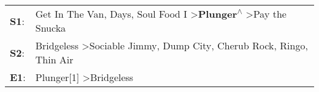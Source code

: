 \begin{supertabular}{p{0.03\textwidth}p{0.92\textwidth}}
 \textbf{S1}:  &      Get In The Van\textsuperscript{},  Days\textsuperscript{}, \enspace Soul Food I\textsuperscript{} \textgreater \enspace \textbf{Plunger\textsuperscript{$\wedge$}} \textgreater \enspace Pay the Snucka\textsuperscript{}  \enspace  \\
 \textbf{S2}:  &  Bridgeless\textsuperscript{} \textgreater \enspace Sociable Jimmy\textsuperscript{}, \enspace Dump City\textsuperscript{}, \enspace Cherub Rock\textsuperscript{}, \enspace Ringo\textsuperscript{}, \enspace Thin Air\textsuperscript{}  \enspace  \\
 \textbf{E1}:  &                                                                                                                                                           Plunger[1]\textsuperscript{} \textgreater \enspace Bridgeless\textsuperscript{}  \enspace  \\
\end{supertabular}
